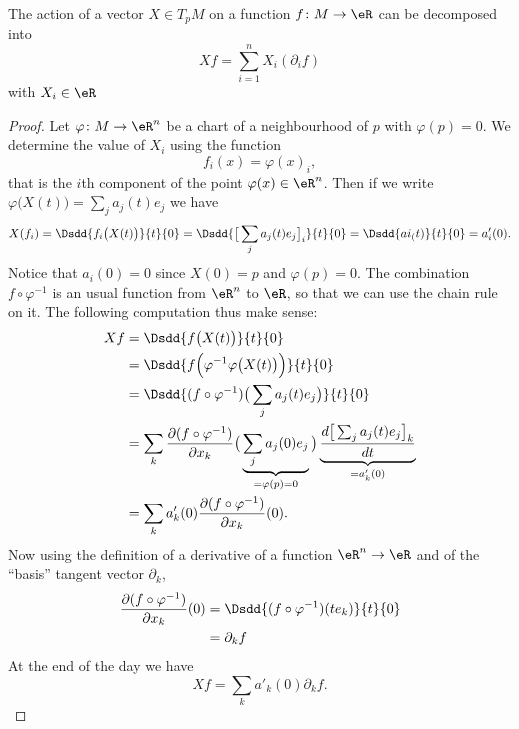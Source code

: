 \begin{lemma}       \label{LEMooXDESooHXzIJU}
    The action of a vector \( X\in T_pM\) on a function \( f\colon M\to \eR\) can be decomposed into
    \begin{equation}
        Xf=\sum_{i=1}^n X_i(\partial_if)
    \end{equation}
    with \( X_i\in\eR\)
\end{lemma}

\begin{proof}
    Let \( \varphi\colon M\to \eR^n\) be a chart of a neighbourhood of \( p\) with \( \varphi(p)=0\). We determine the value of \( X_i\) using the function
    \begin{equation}
        f_i(x)=\varphi(x)_i,
    \end{equation}
    that is the \( i\)th component of the point \( \varphi(x)\in\eR^n\). Then if we write \( \varphi\big( X(t) \big)=\sum_j a_j(t)e_j\) we have
    \begin{subequations}
        \begin{align}
            X(f_i)=\Dsdd{ f_i\big( X(t) \big) }{t}{0}=\Dsdd{ \big[ \sum_ja_j(t)e_j \big]_i }{t}{0}=\Dsdd{ ai_(t) }{t}{0}=a_i'(0).
        \end{align}
    \end{subequations}
    Notice that \( a_i(0)=0\) since \( X(0)=p\) and \( \varphi(p)=0\). The combination \( f\circ\varphi^{-1}\) is an usual function from \( \eR^n\) to \( \eR\), so that we can use the chain rule on it. The following computation thus make sense:
    \begin{subequations}
        \begin{align}
            Xf&=\Dsdd{ f\big( X(t) \big) }{t}{0}\\
            &=\Dsdd{ f\Big( \varphi^{-1}\varphi\big( X(t) \big) \Big) }{t}{0}\\
            &=\Dsdd{ (f\circ\varphi^{-1})\big( \sum_ja_j(t)e_j \big) }{t}{0}\\
            &=\sum_k \frac{ \partial (f\circ\varphi^{-1}) }{ \partial x_k }\big( \underbrace{\sum_ja_j(0)e_j}_{=\varphi(p)=0} \big)\underbrace{\frac{ d\big[ \sum_ja_j(t)e_j \big]_k  }{ dt }}_{=a'_k(0)}\\
            &=\sum_k a'_k(0)\frac{ \partial (f\circ\varphi^{-1}) }{ \partial x_k }(0).
        \end{align}
    \end{subequations}
    Now using the definition of a derivative of a function \( \eR^n\to \eR\) and of the ``basis'' tangent vector \( \partial_k\),
    \begin{subequations}
        \begin{align}
            \frac{ \partial (f\circ\varphi^{-1}) }{ \partial x_k }(0)&=\Dsdd{ (f\circ\varphi^{-1})(te_k) }{t}{0}\\
            &=\partial_k f
        \end{align}
    \end{subequations}
   At the end of the day we have
   \begin{equation}
       Xf=\sum_k a'_k(0)\partial_kf.
   \end{equation}
\end{proof}

